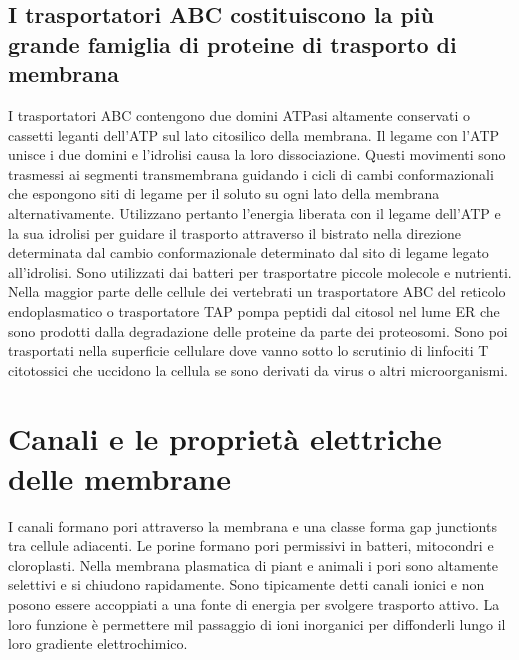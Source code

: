 \subsection{I trasportatori ABC costituiscono la pi\`u grande famiglia di proteine di trasporto di membrana}
I trasportatori ABC contengono due domini ATPasi altamente conservati o cassetti leganti dell'ATP sul lato citosilico della membrana. Il legame con l'ATP unisce i due domini e l'idrolisi
causa la loro dissociazione. Questi movimenti sono trasmessi ai segmenti transmembrana guidando i cicli di cambi conformazionali che espongono siti di legame per il soluto su ogni lato
della membrana alternativamente. Utilizzano pertanto l'energia liberata con il legame dell'ATP e la sua idrolisi per guidare il trasporto attraverso il bistrato nella direzione 
determinata dal cambio conformazionale determinato dal sito di legame legato all'idrolisi. Sono utilizzati dai batteri per trasportatre piccole molecole e nutrienti. Nella maggior parte
delle cellule dei vertebrati un trasportatore ABC del reticolo endoplasmatico o trasportatore TAP pompa peptidi dal citosol nel lume ER che sono prodotti dalla degradazione delle 
proteine da parte dei proteosomi. Sono poi trasportati nella superficie cellulare dove vanno sotto lo scrutinio di linfociti T citotossici che uccidono la cellula se sono derivati da
virus o altri microorganismi. 
\section{Canali e le propriet\`a elettriche delle membrane}
I canali formano pori attraverso la membrana e una classe forma gap junctionts tra cellule adiacenti. Le porine formano pori permissivi in batteri, mitocondri e cloroplasti. Nella
membrana plasmatica di piant e animali i pori sono altamente selettivi e si chiudono rapidamente. Sono tipicamente detti canali ionici e non posono essere accoppiati a una fonte di 
energia per svolgere trasporto attivo. La loro funzione \`e permettere mil passaggio di ioni inorganici per diffonderli lungo il loro gradiente elettrochimico. 
